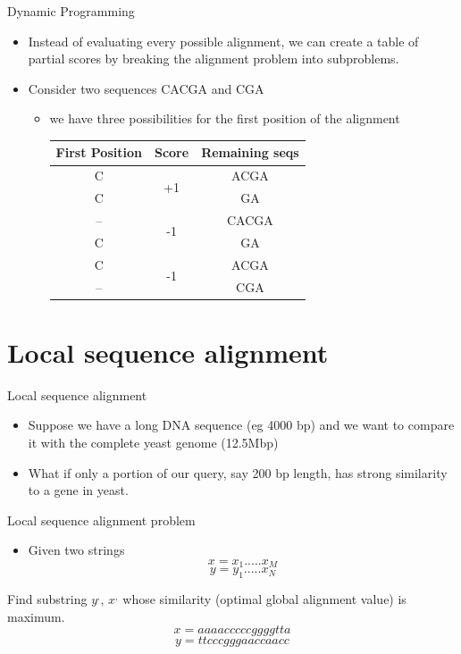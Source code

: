 \documentclass{bredelebeamer}
\begin{document}
  \begin{frame}{Dynamic Programming}
     \begin{itemize}
         \item Instead of evaluating every possible alignment, we can create a 
table of partial scores by breaking the alignment problem into subproblems.
\item Consider two sequences CACGA and CGA
\begin{itemize}
         \item we have three possibilities for the first position of the alignment
         \newline
\begin{table}[]
\begin{tabular}{|c|c|c|}
\hline
First Position & Score               & Remaining seqs \\ \hline
C              & \multirow{2}{*}{+1} & ACGA           \\
C              &                     & GA             \\ \hline
--             & \multirow{2}{*}{-1} & CACGA          \\
C              &                     & GA             \\ \hline
C              & \multirow{2}{*}{-1} & ACGA           \\
--             &                     & CGA            \\ \hline
\end{tabular}
\end{table}
     \end{itemize}
     \end{itemize}
 \end{frame}
 
 \section{Local sequence alignment}
 \begin{frame}{Local sequence alignment}
\begin{itemize}
    \item Suppose we have a long DNA sequence (eg 4000 bp) and we want to compare it with the 
complete yeast genome (12.5Mbp)
\item What if only a portion of our query, say 200 bp
length, has strong similarity to a gene in yeast.
\end{itemize}   
 \end{frame}
  \begin{frame}{Local sequence alignment problem}
\begin{itemize}
    \item Given two strings 
    $$x=x_1.....x_M$$ 
     $$y=y_1.....x_N$$
\end{itemize} 
Find substring $y^,$, $x^,$ whose similarity
(optimal global alignment value) is maximum.
 $$ x = aaaacccccggggtta $$
 $$ y = ttcccgggaaccaacc $$

 \end{frame}
\end{document}

